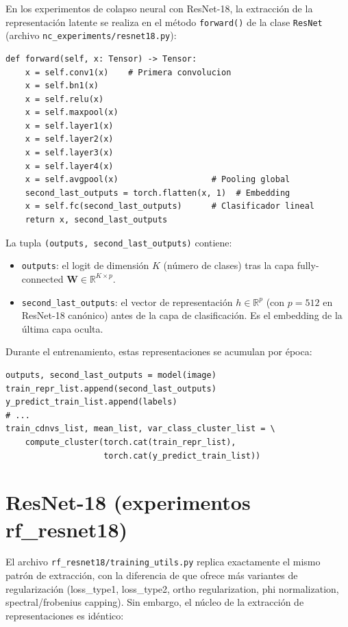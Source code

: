 \documentclass[12pt,a4paper]{report}
\newcommand{\R}{\mathbb{R}}
\begin{document}
En los experimentos de colapso neural con ResNet-18, la extracción de la representación latente se realiza en el método \texttt{forward()} de la clase \texttt{ResNet} (archivo \texttt{nc\_experiments/resnet18.py}):

\begin{lstlisting}
def forward(self, x: Tensor) -> Tensor:
    x = self.conv1(x)    # Primera convolucion
    x = self.bn1(x)
    x = self.relu(x)
    x = self.maxpool(x)
    x = self.layer1(x)
    x = self.layer2(x)
    x = self.layer3(x)
    x = self.layer4(x)
    x = self.avgpool(x)                   # Pooling global
    second_last_outputs = torch.flatten(x, 1)  # Embedding
    x = self.fc(second_last_outputs)      # Clasificador lineal
    return x, second_last_outputs
\end{lstlisting}

La tupla \texttt{(outputs, second\_last\_outputs)} contiene:
\begin{itemize}
    \item \texttt{outputs}: el logit de dimensión $K$ (número de clases) tras la capa fully-connected $\mathbf{W} \in \R^{K \times p}$.
    \item \texttt{second\_last\_outputs}: el vector de representación $h \in \R^p$ (con $p=512$ en ResNet-18 canónico) antes de la capa de clasificación. Es el embedding de la última capa oculta.
\end{itemize}

Durante el entrenamiento, estas representaciones se acumulan por época:
\begin{lstlisting}
outputs, second_last_outputs = model(image)
train_repr_list.append(second_last_outputs)
y_predict_train_list.append(labels)
# ...
train_cdnvs_list, mean_list, var_class_cluster_list = \
    compute_cluster(torch.cat(train_repr_list),
                    torch.cat(y_predict_train_list))
\end{lstlisting}

\section{ResNet-18 (experimentos rf\_resnet18)}

El archivo \texttt{rf\_resnet18/training\_utils.py} replica exactamente el mismo patrón de extracción, con la diferencia de que ofrece más variantes de regularización (loss\_type1, loss\_type2, ortho regularization, phi normalization, spectral/frobenius capping). Sin embargo, el núcleo de la extracción de representaciones es idéntico:
\end{document}
